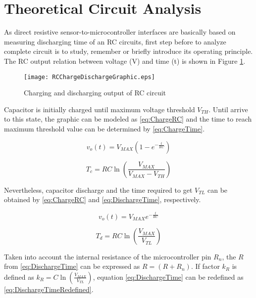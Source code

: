 \section{Theoretical Circuit Analysis}\label{S:Res:Analysis}
As direct resistive sensor-to-microcontroller interfaces are basically based on measuring discharging time of an RC circuits, first step before to analyze complete circuit is to study, remember or briefly introduce its operating principle. The RC output relation between voltage (V) and time (t) is shown in Figure \ref{fig:RCChargeDischargeGraphic}.

\begin{figure}[h]
\centering
\texttt{[image: RCChargeDischargeGraphic.eps]}
\caption{Charging and discharging output of RC circuit}
\label{fig:RCChargeDischargeGraphic}
\end{figure}

Capacitor is initially charged until maximum voltage threshold $V_{TH}$. Until arrive to this state, the graphic can be modeled as \eqref{eq:ChargeRC} and the time to reach maximum threshold value can be determined by \eqref{eq:ChargeTime}.

\begin{equation}
\label{eq:ChargeRC}
v_{o}(t) = V_{MAX}(1-e^{-\frac{t}{RC}})
\end{equation}

\begin{equation}
\label{eq:ChargeTime}
T_{c} = RC\ln(\frac{V_{MAX}}{V_{MAX}-V_{TH}})
\end{equation}

Nevertheless, capacitor discharge and the time required to get $V_{TL}$ can be obtained by \eqref{eq:ChargeRC} and \eqref{eq:DischargeTime}, respectively.

\begin{equation}
\label{eq:DischargeRC}
v_{o}(t) = V_{MAX}e^{-\frac{t}{RC}}
\end{equation}

\begin{equation}
\label{eq:DischargeTime}
T_{d} = RC\ln(\frac{V_{MAX}}{V_{TL}})
\end{equation}

Taken into account the internal resistance of the microcontroller pin $R_{n}$, the $R$ from \eqref{eq:DischargeTime} can be expressed as $R=(R+R_{n})$. If factor $k_{R}$ is defined as $k_{R}=C\ln(\frac{V_{MAX}}{V_{TL}})$, equation \eqref{eq:DischargeTime} can be redefined as \eqref{eq:DischargeTimeRedefined}.


